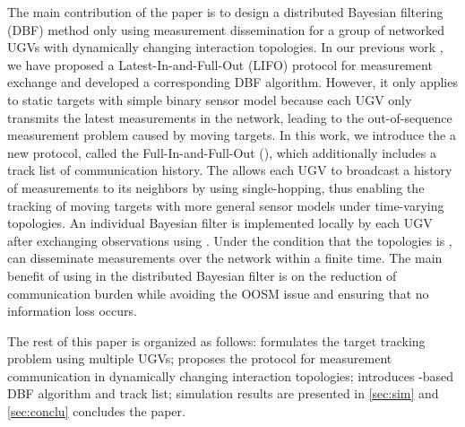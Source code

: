 	The main contribution of the paper is to design a distributed Bayesian filtering (DBF) method only using measurement dissemination for a group of networked UGVs with dynamically changing interaction topologies. 
	In our previous work \cite{liu2016distributed}, we have proposed a Latest-In-and-Full-Out (LIFO) protocol for measurement exchange and developed a corresponding DBF algorithm.
	However, it only applies to static targets with simple binary sensor model because each UGV only transmits the latest measurements in the network, leading to the out-of-sequence measurement problem caused by moving targets.
	In this work, we introduce the a new protocol, called the Full-In-and-Full-Out (\proto), which additionally includes a track list of communication history.
	The {\proto} allows each UGV to broadcast a history of measurements to its neighbors by using single-hopping, thus enabling the tracking of moving targets with more general sensor models under time-varying topologies.
	An individual Bayesian filter is implemented locally by each UGV after exchanging observations using \proto.
	Under the condition that the topologies is \fc, {\proto} can disseminate measurements over the network within a finite time.
	The main benefit of using {\proto} in the distributed Bayesian filter is on the reduction of communication burden while avoiding the OOSM issue and ensuring that no information loss occurs.
	
	The rest of this paper is organized as follows: 
	 formulates the target tracking problem using multiple UGVs;
	 proposes the {\proto} protocol for measurement communication in dynamically changing interaction topologies;
	 introduces \proto-based DBF algorithm and track list;
	simulation results are presented in \cref{sec:sim} and \cref{sec:conclu} concludes the paper.